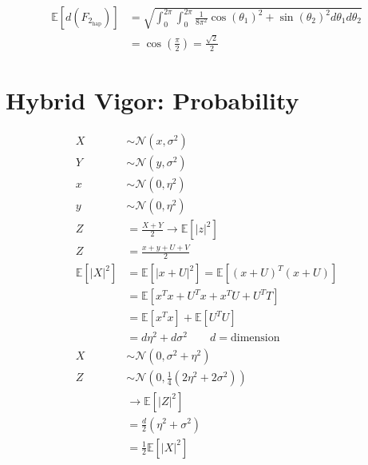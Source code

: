 \documentclass{article}
\newcommand{\1}{\mathbbm{1}}
\newcommand{\fit}{\mathcal{F}}
\begin{document}
  \begin{align*}
    \mathbb{E}\left[ d(F_{2_{\text{hap}}}) \right] &= \sqrt{\int_{0}^{2 \pi} \int_{0}^{2 \pi} \frac{1}{8 \pi^{2}} \cos(\theta_1)^{2} + \sin(\theta_2)^{2} d\theta_1 d\theta_2} \\
    &= \cos \left( \frac{\pi}{2} \right) = \frac{\sqrt{2}}{2}
  \end{align*}


  \section{Hybrid Vigor: Probability}

  \begin{align*}
    X &\sim \mathcal{N} (x, \sigma^{2}) \\
    Y &\sim \mathcal{N} (y, \sigma^{2}) \\
    x &\sim \mathcal{N} (0, \eta^{2}) \\
    y &\sim \mathcal{N}(0, \eta^{2}) \\
    Z &= \frac{X+Y}{2} \rightarrow \mathbb{E} \left[ \lvert z \rvert^{2} \right] \\
    Z &= \frac{x+y+U+V}{2} \\
    \mathbb{E} \left[ \lvert X \rvert^{2} \right] &= \mathbb{E} \left[ \lvert x + U \rvert^{2} \right] = \mathbb{E} \left[ (x+U)^{T} (x+U) \right] \\
    &= \mathbb{E} \left[ x^{T}x + U^{T}x + x^{T}U + U^{T}T \right] \\
    &= \mathbb{E} \left[x^{T}x\right] + \mathbb{E} \left[U^{T}U\right] \\
    &= d\eta^{2} + d\sigma^{2} \qquad d=\text{dimension} \\
    X &\sim \mathcal{N}(0, \sigma^{2} + \eta^{2}) \\
    Z &\sim \mathcal{N}\left(0, \frac{1}{4}(2 \eta^{2} + 2\sigma^{2})\right) \\
    &\rightarrow \mathbb{E}\left[\lvert Z \rvert^{2} \right] \\
    &= \frac{d}{2} \left(\eta^{2} + \sigma^{2} \right) \\
    &= \frac{1}{2} \mathbb{E} \left[ \lvert X \rvert^{2} \right]
  \end{align*}
\end{document}
